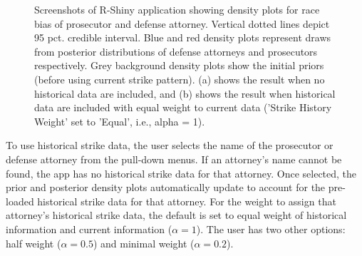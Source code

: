 \documentclass[12pt]{article}
\begin{document}
\begin{figure}

{\centering {}

}

\caption{Screenshots of R-Shiny application showing density plots for race bias of prosecutor and defense attorney. Vertical dotted lines depict 95 pct. credible interval. Blue and red density plots represent draws from posterior distributions of defense attorneys and prosecutors respectively. Grey background density plots show the initial priors (before using current strike pattern). (a) shows the result when no historical data are included, and (b) shows the result when historical data are included with equal weight to current data ('Strike History Weight' set to 'Equal', i.e., alpha = 1).}\label{fig:figapp1}
\end{figure}

To use historical strike data, the user selects the name of the prosecutor or defense attorney from the pull-down menus. If an attorney's name cannot be found, the app has no historical strike data for that attorney. Once selected, the prior and posterior density plots automatically update to account for the pre-loaded historical strike data for that attorney. For the weight to assign that attorney's historical strike data, the default is set to equal weight of historical information and current information (\(\alpha = 1\)). The user has two other options: half weight (\(\alpha = 0.5\)) and minimal weight (\(\alpha = 0.2\)).
\end{document}
